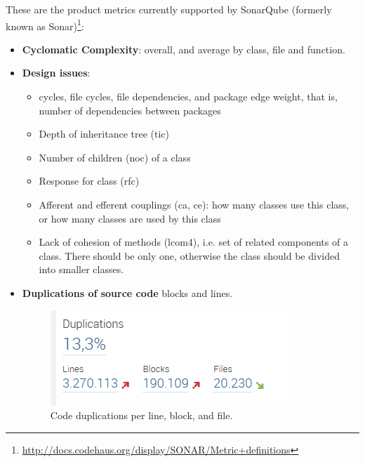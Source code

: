 These are the product metrics currently supported by SonarQube (formerly known
as Sonar)\footnote{\url{http://docs.codehaus.org/display/SONAR/Metric+definitions}}:
\begin{itemize}
	\item \textbf{Cyclomatic Complexity}: overall, and average by class, file and function.
	\item \textbf{Design issues}: 
	\begin{itemize}
		\item cycles, file cycles, file dependencies, and package edge weight, 
		that is, number of dependencies between packages
		\item Depth of inheritance tree (tic)
		\item Number of children (noc) of a class
		\item Response for class (rfc) 
		\item Afferent and efferent couplings (ca, ce): how many classes use 
		this class, or how many classes are used by this class
		\item Lack of cohesion of methods (lcom4), i.e. set of related 
		components of a class. There should be only one, otherwise the class should be divided into smaller classes.
	\end{itemize}
	\item \textbf{Duplications of source code} blocks and lines.
	\begin{figure}[h]
		\centering
		\includegraphics[scale=0.5]{img/code_duplications.jpg}
		\caption{Code duplications per line, block, and file.} 
		\label{fig:code_duplications}
	\end{figure}
	

\end{itemize}
